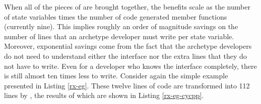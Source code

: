 When all of the pieces of \cycpp are brought together, the benefits scale as the 
number of state variables times the number of code generated member functions 
(currently nine). This implies roughly an order of magnitude savings on the number of 
lines that an archetype developer must write per state variable. Moreover, 
exponential savings come from the fact that the archetype developers do not need
to understand either the \cyclus interface nor the extra lines that they do not have to write.
Even for a developer who knows the \cyclus
interface completely, there is still almost ten times less to write. Consider 
again the simple  example presented in Listing \ref{rx-eg}.  These twelve 
lines of code are transformed into 112 lines by \cycpp, the results of which
are shown in Listing \ref{rx-eg-cycpp}. 

